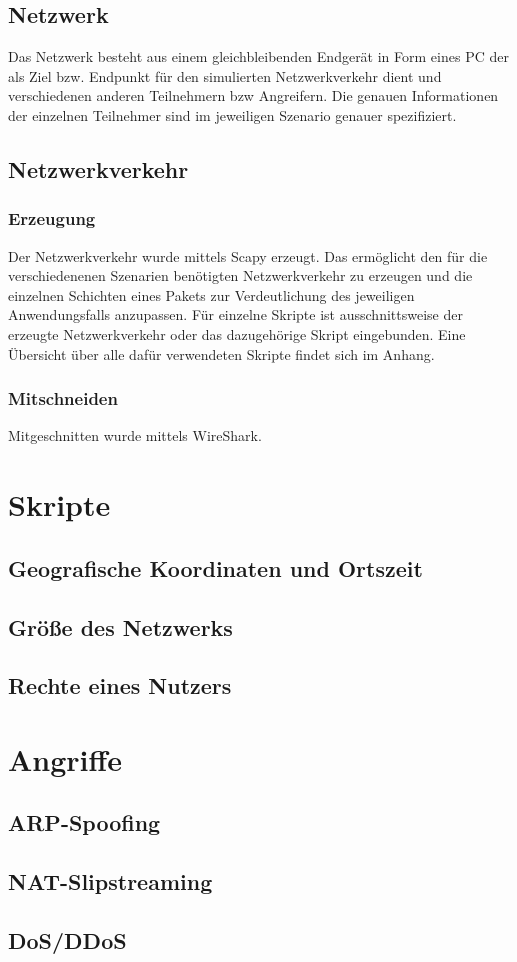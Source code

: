 \subsection{Netzwerk}
Das Netzwerk besteht aus einem gleichbleibenden Endgerät in Form eines PC der als Ziel bzw. Endpunkt für den simulierten Netzwerkverkehr dient und verschiedenen anderen Teilnehmern bzw Angreifern. Die genauen Informationen der einzelnen Teilnehmer sind im jeweiligen Szenario genauer spezifiziert.
\subsection{Netzwerkverkehr}
\subsubsection{Erzeugung}
Der Netzwerkverkehr wurde mittels Scapy erzeugt. Das ermöglicht den für die verschiedenenen Szenarien benötigten Netzwerkverkehr zu erzeugen und die einzelnen Schichten eines Pakets zur Verdeutlichung des jeweiligen Anwendungsfalls anzupassen. Für einzelne Skripte ist ausschnittsweise der erzeugte Netzwerkverkehr oder das dazugehörige Skript eingebunden. Eine Übersicht über alle dafür verwendeten Skripte findet sich im Anhang.
\subsubsection{Mitschneiden}
Mitgeschnitten wurde mittels WireShark.

\section{Skripte}
\subsection{Geografische Koordinaten und Ortszeit}

\subsection{Größe des Netzwerks}

\subsection{Rechte eines Nutzers}

\section{Angriffe}
\subsection{ARP-Spoofing}
\subsection{NAT-Slipstreaming}
\subsection{DoS/DDoS}
\subsection{}